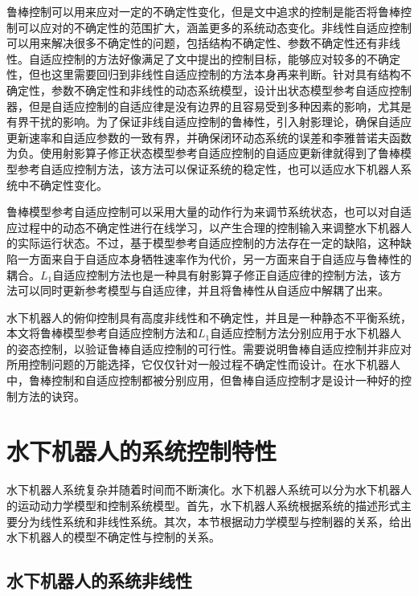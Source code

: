 鲁棒控制可以用来应对一定的不确定性变化，但是文中追求的控制是能否将鲁棒控制可以应对的不确定性的范围扩大，涵盖更多的系统动态变化。非线性自适应控制可以用来解决很多不确定性的问题，包括结构不确定性、参数不确定性还有非线性。自适应控制的方法好像满足了文中提出的控制目标，能够应对较多的不确定性，但也这里需要回归到非线性自适应控制的方法本身再来判断。针对具有结构不确定性，参数不确定性和非线性的动态系统模型，设计出状态模型参考自适应控制器，但是自适应控制的自适应律是没有边界的且容易受到多种因素的影响，尤其是有界干扰的影响。为了保证非线自适应控制的鲁棒性，引入射影理论，确保自适应更新速率和自适应参数的一致有界，并确保闭环动态系统的误差和李雅普诺夫函数为负。使用射影算子修正状态模型参考自适应控制的自适应更新律就得到了鲁棒模型参考自适应控制方法，该方法可以保证系统的稳定性，也可以适应水下机器人系统中不确定性变化。

鲁棒模型参考自适应控制可以采用大量的动作行为来调节系统状态，也可以对自适应过程中的动态不确定性进行在线学习，以产生合理的控制输入来调整水下机器人的实际运行状态。不过，基于模型参考自适应控制的方法存在一定的缺陷，这种缺陷一方面来自于自适应本身牺牲速率作为代价，另一方面来自于自适应与鲁棒性的耦合。$L_1$自适应控制方法也是一种具有射影算子修正自适应律的控制方法，该方法可以同时更新参考模型与自适应律，并且将鲁棒性从自适应中解耦了出来。

水下机器人的俯仰控制具有高度非线性和不确定性，并且是一种静态不平衡系统，本文将鲁棒模型参考自适应控制方法和$L_1$自适应控制方法分别应用于水下机器人的姿态控制，以验证鲁棒自适应控制的可行性。需要说明鲁棒自适应控制并非应对所用控制问题的万能选择，它仅仅针对一般过程不确定性而设计。在水下机器人中，鲁棒控制和自适应控制都被分别应用，但鲁棒自适应控制才是设计一种好的控制方法的诀窍。

\section{水下机器人的系统控制特性 }

水下机器人系统复杂并随着时间而不断演化。水下机器人系统可以分为水下机器人的运动动力学模型和控制系统模型。首先，水下机器人系统根据系统的描述形式主要分为线性系统和非线性系统。其次，本节根据动力学模型与控制器的关系，给出水下机器人的模型不确定性与控制的关系。


\subsection{水下机器人的系统非线性 }

